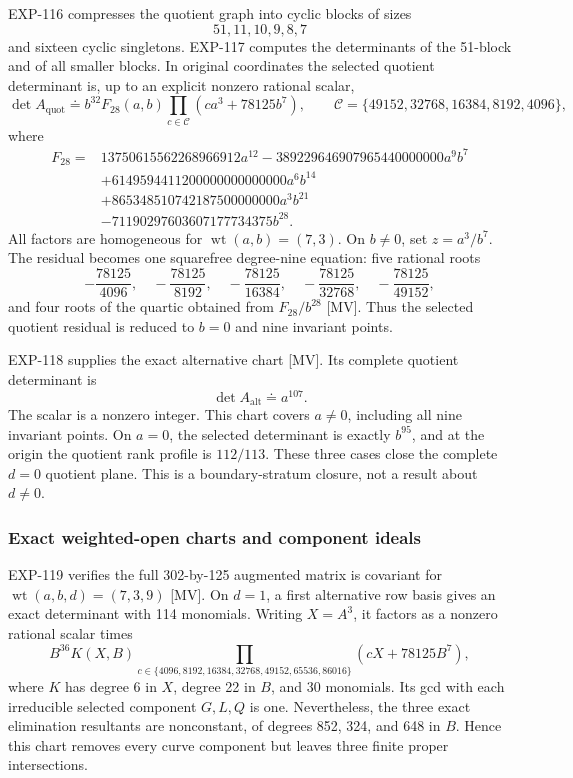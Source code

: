 \documentclass[11pt]{article}
\theoremstyle{remark}
\begin{document}
EXP-116 compresses the quotient graph into cyclic blocks of sizes
\[
51,11,10,9,8,7
\]
and sixteen cyclic singletons. EXP-117 computes the determinants of the
51-block and of all smaller blocks. In original coordinates the selected
quotient determinant is, up to an explicit nonzero rational scalar,
\[
\det A_{\mathrm{quot}}
\doteq
b^{32}F_{28}(a,b)
\prod_{c\in\mathcal C}(ca^3+78125b^7),
\qquad
\mathcal C=\{49152,32768,16384,8192,4096\},
\]
where
\[
\begin{aligned}
F_{28}={}&13750615562268966912a^{12}
-389229646907965440000000a^9b^7\\
&+6149594411200000000000000a^6b^{14}\\
&+865348510742187500000000a^3b^{21}\\
&-71190297603607177734375b^{28}.
\end{aligned}
\]
All factors are homogeneous for
\(\operatorname{wt}(a,b)=(7,3)\). On \(b\ne0\), set \(z=a^3/b^7\). The
residual becomes one squarefree degree-nine equation: five rational roots
\[
-\frac{78125}{4096},\quad -\frac{78125}{8192},\quad
-\frac{78125}{16384},\quad -\frac{78125}{32768},\quad
-\frac{78125}{49152},
\]
and four roots of the quartic obtained from \(F_{28}/b^{28}\) [MV].
Thus the selected quotient residual is reduced to \(b=0\) and nine invariant
points.

EXP-118 supplies the exact alternative chart [MV]. Its complete quotient
determinant is
\[
\det A_{\mathrm{alt}}\doteq a^{107}.
\]
The scalar is a nonzero integer. This chart covers \(a\ne0\),
including all nine invariant points. On \(a=0\), the selected determinant is
exactly \(b^{95}\), and at the origin the quotient rank profile is
\(112/113\). These three cases close the complete \(d=0\) quotient plane.
This is a boundary-stratum closure, not a result about \(d\ne0\).

\subsubsection{Exact weighted-open charts and component ideals}

EXP-119 verifies the full 302-by-125 augmented matrix is covariant for
\(\operatorname{wt}(a,b,d)=(7,3,9)\) [MV]. On \(d=1\), a first alternative
row basis gives an exact determinant with 114 monomials. Writing \(X=A^3\),
it factors as a nonzero rational scalar times
\[
B^{36}K(X,B)
\prod_{c\in\{4096,8192,16384,32768,49152,65536,86016\}}
(cX+78125B^7),
\]
where \(K\) has degree 6 in \(X\), degree 22 in \(B\), and 30 monomials.
Its gcd with each irreducible selected component \(G,L,Q\) is one.
Nevertheless, the three exact elimination resultants are nonconstant, of
degrees 852, 324, and 648 in \(B\). Hence this chart removes every curve
component but leaves three finite proper intersections.
\end{document}
